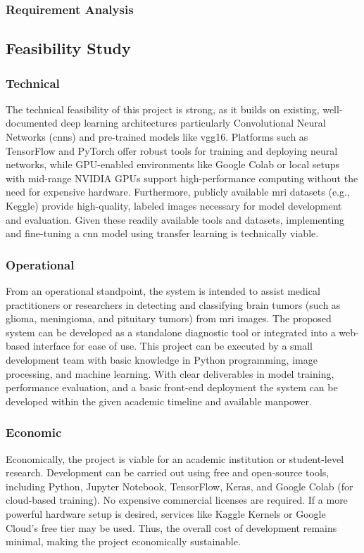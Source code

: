\subsubsection{Requirement Analysis}
\subsection{Feasibility Study}
\subsubsection{Technical}
 The technical feasibility of this project is strong, as it builds on existing, well-documented deep learning architectures particularly Convolutional Neural Networks (\gls{cnn}s) and pre-trained models like \gls{vgg16}. Platforms such as TensorFlow and PyTorch offer robust tools for training and deploying neural networks, while GPU-enabled environments like Google Colab or local setups with mid-range NVIDIA GPUs support high-performance computing without the need for expensive hardware. Furthermore, publicly available \gls{mri} datasets (e.g., Keggle) provide high-quality, labeled images necessary for model development and evaluation. Given these readily available tools and datasets, implementing and fine-tuning a \gls{cnn} model using transfer learning is technically viable.
 
\subsubsection{Operational}
From an operational standpoint, the system is intended to assist medical practitioners or researchers in detecting and classifying brain tumors (such as glioma, meningioma, and pituitary tumors) from \gls{mri} images. The proposed system can be developed as a standalone diagnostic tool or integrated into a web-based interface for ease of use. This project can be executed by a small development team with basic knowledge in Python programming, image processing, and machine learning. With clear deliverables in model training, performance evaluation, and a basic front-end deployment the system can be developed within the given academic timeline and available manpower.

\subsubsection{Economic}
Economically, the project is viable for an academic institution or student-level research. Development can be carried out using free and open-source tools, including Python, Jupyter Notebook, TensorFlow, Keras, and Google Colab (for cloud-based training). No expensive commercial licenses are required. If a more powerful hardware setup is desired, services like Kaggle Kernels or Google Cloud's free tier may be used. Thus, the overall cost of development remains minimal, making the project economically sustainable.

